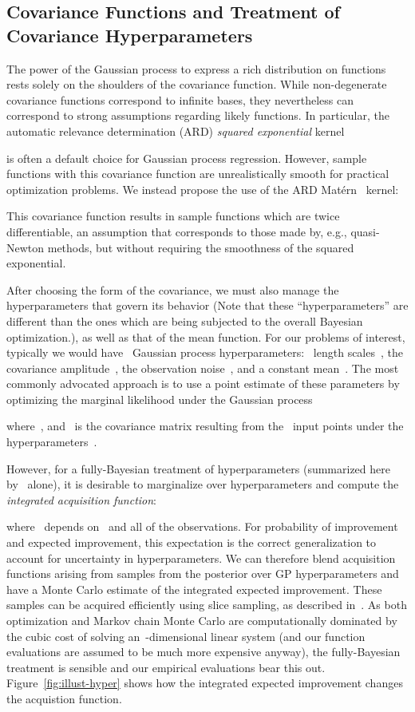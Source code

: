 \documentclass[aos,preprint]{imsart}
\begin{document}
\subsection{Covariance Functions and Treatment of Covariance Hyperparameters}
\label{sec:covariances}
The power of the Gaussian process to express a rich distribution on
functions rests solely on the shoulders of the covariance function.
While non-degenerate covariance functions correspond to infinite
bases, they nevertheless can correspond to strong assumptions
regarding likely functions.  In particular, the automatic relevance
determination (ARD) \emph{squared exponential} kernel 

is often a default choice for Gaussian process regression.  However,
sample functions with this covariance function are unrealistically
smooth for practical optimization problems.  We instead propose the
use of the ARD Mat\'{e}rn~ kernel:

This covariance function results in sample functions which are
twice differentiable, an assumption that corresponds to those made by,
e.g., quasi-Newton methods, but without requiring the smoothness of
the squared exponential.

After choosing the form of the covariance, we must also manage the
hyperparameters that govern its behavior (Note that these
``hyperparameters'' are different than the ones which are being
subjected to the overall Bayesian optimization.), as well as that of
the mean function.  For our problems of interest, typically we
would have~ Gaussian process hyperparameters:~ length
scales~, the covariance amplitude~, the
observation noise~, and a constant mean~.  The most commonly
advocated approach is to use a point estimate of these parameters by
optimizing the marginal likelihood under the Gaussian
process

where~, and~
is the covariance matrix resulting from the~ input points under the
hyperparameters~.

However, for a fully-Bayesian treatment of hyperparameters (summarized
here by~ alone), it is desirable to marginalize over
hyperparameters and compute the \emph{integrated acquisition
  function}:


where~ depends on~ and all of the observations.  For
probability of improvement and expected improvement, this expectation
is the correct generalization to account for uncertainty in
hyperparameters.  We can therefore blend acquisition functions arising
from samples from the posterior over GP hyperparameters and have a
Monte Carlo estimate of the integrated expected improvement.  These
samples can be acquired efficiently using slice sampling, as described
in~\citet{Murray-Adams-2010a}.  As both optimization
and Markov chain Monte Carlo are computationally dominated by the
cubic cost of solving an~-dimensional linear system (and our
function evaluations are assumed to be much more expensive anyway),
the fully-Bayesian treatment is sensible and our empirical evaluations
bear this out.  Figure~\ref{fig:illust-hyper} shows how the integrated
expected improvement changes the acquistion function.
\end{document}

